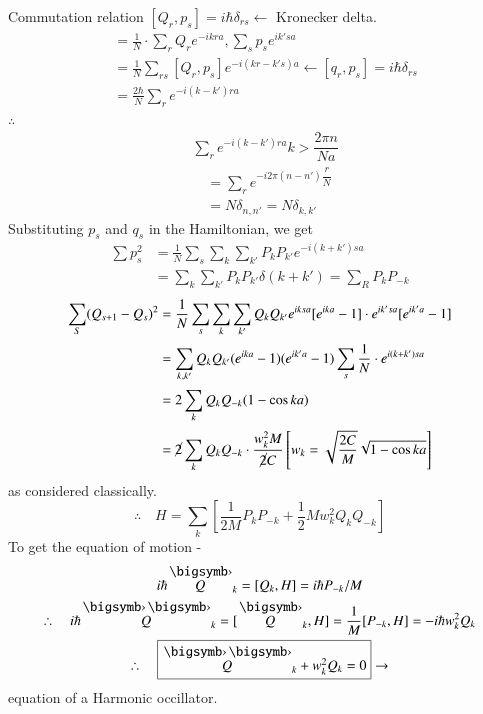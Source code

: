 Commutation relation $[Q_{r},p_{s}]=i\hbar \delta_{rs} \leftarrow$ Kronecker delta.
\begin{align*}
[Q_{k},P_{k'}] &= \frac{1}{N}\cdot \sum\limits_{r}Q_{r}e^{-ikra}, \sum\limits_{s}p_{s}e^{ik'sa}\\[2pt]
&= \frac{1}{N}\sum\limits_{rs}[Q_{r},p_{s}]e^{-i(kr-k's)a}\leftarrow [q_{r},p_{s}]=i\hbar \delta_{rs}\\[2pt]
&= \frac{2\hbar}{N}\sum\limits_{r}e^{-i(k-k')ra}
\end{align*}
$\therefore \ $ 
\begin{align*}
& \sum\limits_{r}e^{-i(k-k')ra}k>\dfrac{2\pi n}{Na}\\[2pt]
&\quad =\sum\limits_{r}e^{-i2\pi(n-n')\dfrac{r}{N}}\\[2pt]
&\quad =N\delta_{n,n'}=N\delta_{k,k'}
\end{align*}
Substituting $p_{s}$ and $q_{s}$ in the Hamiltonian, we get
\begin{align*}
\sum p^{2}_{s} &= \frac{1}{N}\sum\limits_{s}\sum\limits_{k}\sum\limits_{k'}P_{k}P_{k'}e^{-i(k+k')sa}\\[2pt]
&= \sum\limits_{k}\sum\limits_{k'}P_{k}P_{k'}\delta(k+k')=\sum\limits_{R}P_{k}P_{-k}
\end{align*}
\begin{align*}
\sum\limits_{S}(Q_{s+1}-Q_{s})^{2} &= \frac{1}{N}\sum\limits_{s}\sum\limits_{k}\sum\limits_{k'}Q_{k}Q_{k'}e^{iksa}[e^{ika}-1]\cdot e^{ik'sa}[e^{ik'a}-1]\\[2pt]
&=\sum\limits_{k,k'}Q_{k}Q_{k'}(e^{ika}-1)(e^{ik'a}-1)\sum\limits_{s}\frac{1}{N}\cdot e^{i(k+k')sa}\\[2pt]
&= 2\sum\limits_{k}Q_{k}Q_{-k}(1-\cos ka)\\[2pt]
&= \cancel{2}\sum\limits_{k}Q_{k}Q_{-k}\cdot \dfrac{w^{2}_{k}M}{\cancel{2}C} \left[w_{k}=\sqrt{\dfrac{2C}{M}}\sqrt{1-\cos ka}\right]
\end{align*}
as considered classically.
$$
\therefore\quad H=\sum\limits_{k}\left[\frac{1}{2M}P_{k}P_{-k}+\frac{1}{2}Mw^{2}_{k}Q_{k}Q_{-k}\right]
$$
To get the equation of motion -
\begin{gather*}
i\hbar \overdot{Q}_{k}=[Q_{k},H]=i\hbar P_{-k}/M\\
\therefore\quad i\hbar \overddot{Q}_{k}=[\overdot{Q}_{k},H]=\dfrac{1}{M}[P_{-k},H]=-i\hbar w^{2}_{k}Q_{k}\\
\therefore\quad \fbox{$\overddot{Q}_{k}+w^{2}_{k}Q_{k}=0$}\to
\end{gather*}
equation of a Harmonic occillator.

